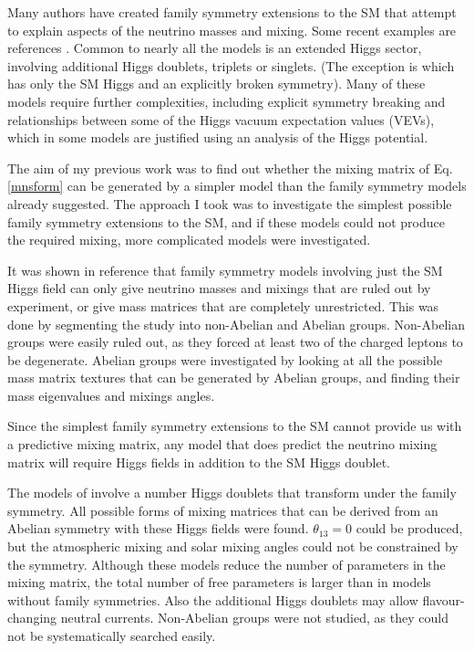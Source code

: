 \documentclass[nofootinbib,showpacs]{revtex4}
\begin{document}
Many authors have created family symmetry extensions to the SM that attempt to explain aspects of the neutrino masses and mixing. Some recent examples are references \cite{kubo,kubohiggspot,grimfav,matbmwithvevs,LavLmodel2}. Common to nearly all the models is an extended Higgs sector, involving additional Higgs doublets, triplets or singlets. (The exception is \cite{LavLmodel2} which has only the SM Higgs and an explicitly broken symmetry). Many of these models require further complexities, including explicit symmetry breaking and relationships between some of the Higgs vacuum expectation values (VEVs), which in some models are justified using an analysis of the Higgs potential.

The aim of my previous work \cite{nogo1,nogo2} was to find out whether the mixing matrix of Eq. \ref{mnsform} can be generated by a simpler model than the family symmetry models already suggested. The approach I took was to investigate the simplest possible family symmetry extensions to the SM, and if these models could not produce the required mixing, more complicated models were investigated.        

It was shown in reference \cite{nogo1} that family symmetry models involving just the SM Higgs field can only give neutrino masses and mixings that are ruled out by experiment, or give mass matrices that are completely unrestricted.
This was done by segmenting the study into non-Abelian and Abelian groups. Non-Abelian groups were easily ruled out, as they forced at least two of the charged leptons to be degenerate. Abelian groups were investigated by looking at all the possible mass matrix textures that can be generated by Abelian groups, and finding their mass eigenvalues and mixings angles. 

Since the simplest family symmetry extensions to the SM cannot provide us with a predictive mixing matrix, any model that does predict the neutrino mixing matrix will require Higgs fields in addition to the SM Higgs doublet. 

The models of \cite{nogo2} involve a number Higgs doublets that transform under the family symmetry. All possible forms of mixing matrices that can be derived from an Abelian symmetry with these Higgs fields were found.  $\theta_{13}=0$ could be produced, but the atmospheric mixing and solar mixing angles could not be constrained by the symmetry. Although these models reduce the number of parameters in the mixing matrix, the total number of free parameters is larger than in models without family symmetries. Also the additional Higgs doublets  may allow flavour-changing neutral currents. Non-Abelian groups were not studied, as they could not be systematically searched easily.
\end{document}
